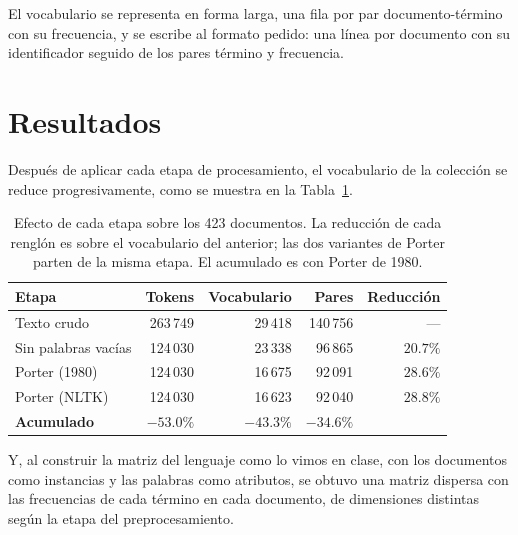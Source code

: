 \documentclass[11pt,letterpaper]{article}
\begin{document}
El vocabulario se representa en forma larga, una fila por par
documento-término con su frecuencia, y se escribe al formato pedido:
una línea por documento con su identificador seguido de los pares
término y frecuencia.

\section{Resultados}
  
Después de aplicar cada etapa de procesamiento, el vocabulario de la colección
se reduce progresivamente, como se muestra en la Tabla~\ref{tab:docs}.

\begin{table}[H]
  \centering
  \begin{tabular}{lrrrr}
    \toprule
    \textbf{Etapa} & \textbf{Tokens} & \textbf{Vocabulario} &
      \textbf{Pares} & \textbf{Reducción} \\
    \midrule
    Texto crudo        & 263\,749 & 29\,418 & 140\,756 &
      --- \\
    Sin palabras vacías & 124\,030 & 23\,338 & 96\,865 &
      $20.7\%$ \\
    Porter (1980)      & 124\,030 & 16\,675 & 92\,091 &
      $28.6\%$ \\
    Porter (NLTK)      & 124\,030 & 16\,623 & 92\,040 &
      $28.8\%$ \\
    \midrule
    \textbf{Acumulado} & $-53.0\%$ & $-43.3\%$ & $-34.6\%$ & \\
    \bottomrule
  \end{tabular}
  \caption{Efecto de cada etapa sobre los 423 documentos. La reducción
    de cada renglón es sobre el vocabulario del anterior; las dos
    variantes de Porter parten de la misma etapa. El acumulado es con
    Porter de 1980.}
  \label{tab:docs}
\end{table}

Y, al construir la matriz del lenguaje como lo vimos en clase, con los
documentos como instancias y las palabras como atributos, se obtuvo una
matriz dispersa con las frecuencias de cada término en cada documento,
de dimensiones distintas según la etapa del preprocesamiento.
\end{document}
